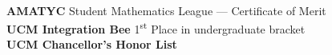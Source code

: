 \documentclass[./Resume.tex]{subfiles}
\begin{document}
    \\{\bfseries AMATYC} Student Mathematics League --- Certificate of Merit\\
    {\bfseries UCM Integration Bee} 1\textsuperscript{st} Place in undergraduate bracket\\
    {\bfseries UCM Chancellor's Honor List}
    \vspace*{-2mm}
\end{document}
